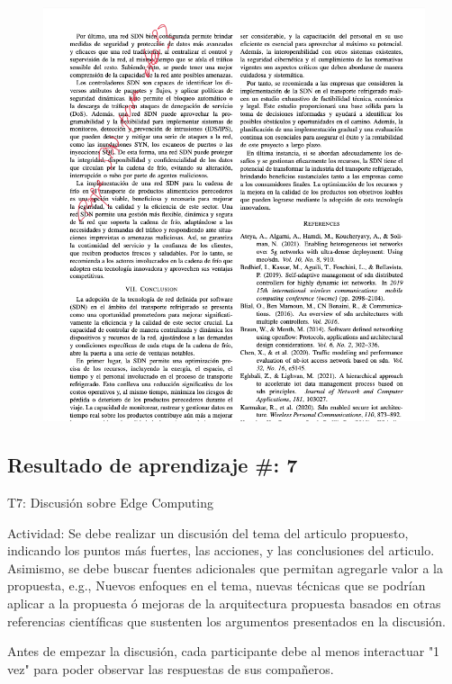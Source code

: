 \begin{figure}[!htbp]
    \centering
    \includegraphics[width=\textwidth]{recursos/ra3/sto3a.png}
\end{figure}

%


\newpage
\subsection{Resultado de aprendizaje \#: 7}
\label{sec:ra7}
T7: Discusión sobre Edge Computing

Actividad: Se debe realizar un discusión del tema del articulo propuesto, indicando los puntos más fuertes, las acciones, y las conclusiones del articulo. Asimismo, se debe buscar fuentes adicionales que permitan agregarle valor a la propuesta, e.g., Nuevos enfoques en el tema, nuevas técnicas que se podrían aplicar a la propuesta ó mejoras de la arquitectura propuesta basados en otras referencias científicas que sustenten los argumentos presentados en la discusión.

Antes de empezar la discusión, cada participante debe al menos interactuar "1 vez" para poder observar las respuestas de sus compañeros. 


